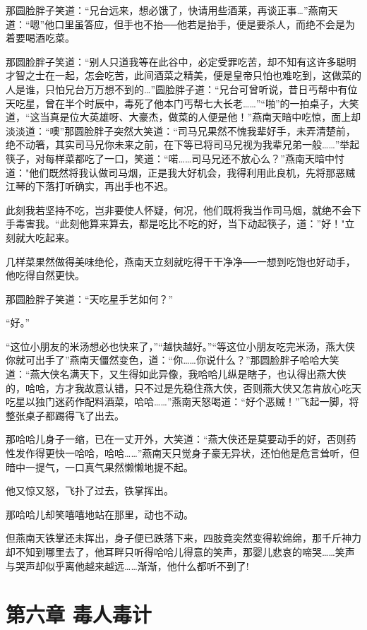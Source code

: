 \documentclass[12pt,oneside]{book}
\begin{document}
那圆脸胖子笑道：``兄台远来，想必饿了，快请用些酒莱，再谈正事\ldots{}''燕南天道：``嗯''他口里虽答应，但手也不抬──他若是抬手，便是要杀人，而绝不会是为着要喝酒吃菜。

那圆脸胖子笑道：``别人只道我等在此谷中，必定受罪吃苦，却不知有这许多聪明才智之士在一起，怎会吃苦，此间酒菜之精美，便是皇帝只怕也难吃到，这做菜的人是谁，只怕兄台万万想不到的\ldots{}''圆脸胖子道：``兄台可曾听说，昔日丐帮中有位天吃星，曾在半个时辰中，毒死了他本门丐帮七大长老\ldots\ldots{}''``啪''的一拍桌子，大笑道，``这当真是位大英雄呀、大豪杰，做菜的人便是他！''燕南天暗中吃惊，面上却淡淡道：``噢''那圆脸胖子突然大笑道：``司马兄果然不愧我辈好手，未弄清楚前，绝不动箸，其实司马兄你未来之前，在下等已将司马兄视为我辈兄弟一般\ldots\ldots{}''举起筷子，对每样菜都吃了一口，笑道：``喏\ldots\ldots 司马兄还不放心么？''燕南天暗中忖道："他们既然将我认做司马烟，正是我大好机会，我得利用此良机，先将那恶贼江琴的下落打听确实，再出手也不迟。

此刻我若坚持不吃，岂非要使人怀疑，何况，他们既将我当作司马烟，就绝不会下手毒害我。``此刻他算来算去，都是吃比不吃的好，当下动起筷子，道：''好！"立刻就大吃起来。

几样菜果然做得美味绝伦，燕南天立刻就吃得干干净净──一想到吃饱也好动手，他吃得自然更快。

那圆脸胖子笑道：``天吃星手艺如何？''

``好。''

``这位小朋友的米汤想必也快来了，''``越快越好。''``等这位小朋友吃完米汤，燕大侠你就可出手了''燕南天僵然变色，道：``你\ldots\ldots 你说什么？''那圆脸胖子哈哈大笑道：``燕大侠名满天下，又生得如此异像，我哈哈儿纵是瞎子，也认得出燕大侠的，哈哈，方才我故意认错，只不过是先稳住燕大侠，否则燕大侠又怎肯放心吃天吃星以独门迷药作配料酒菜，哈哈\ldots\ldots{}''燕南天怒喝道：``好个恶贼！''飞起一脚，将整张桌子都踢得飞了出去。

那哈哈儿身子一缩，已在一丈开外，大笑道：``燕大侠还是莫要动手的好，否则药性发作得更快一哈哈，哈哈\ldots\ldots{}''燕南天只觉身子豪无异状，还怕他是危言耸听，但暗中一提气，一口真气果然懒懒地提不起。

他又惊又怒，飞扑了过去，铁掌挥出。

那哈哈儿却笑嘻嘻地站在那里，动也不动。

但燕南天铁掌还未挥出，身子便已跌落下来，四肢竟突然变得软绵绵，那千斤神力却不知到哪里去了，他耳畔只听得哈哈儿得意的笑声，那婴儿悲哀的啼哭\ldots\ldots 笑声与哭声却似乎离他越来越远\ldots\ldots 渐渐，他什么都听不到了!

\hypertarget{ux7b2cux516dux7ae0-ux6bd2ux4ebaux6bd2ux8ba1}{%
\chapter{第六章
毒人毒计}\label{ux7b2cux516dux7ae0-ux6bd2ux4ebaux6bd2ux8ba1}}
\end{document}
